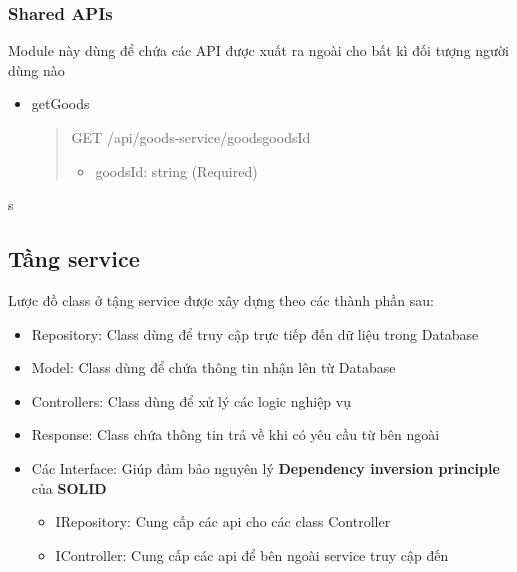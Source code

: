 \subsubsection{Shared APIs}
Module này dùng để chứa các API được xuất ra ngoài cho bất kì đối tượng người dùng nào

\begin{itemize}
	\item getGoods
	\begin{quote}
		GET /api/goods-service/goods{goodsId}
		\begin{itemize}
			\item goodsId: string (Required)
		\end{itemize}
	\end{quote}
\end{itemize}

s

\subsection{Tầng service}

Lược đồ class ở tậng service được xây dựng theo các thành phần sau:
\begin{itemize}
	\item Repository: Class dùng để truy cập trực tiếp đến dữ liệu trong Database
	\item Model: Class dùng để chứa thông tin nhận lên từ Database
	\item Controllers: Class dùng để xử lý các logic nghiệp vụ
	\item Response: Class chứa thông tin trả về khi có yêu cầu từ bên ngoài
	\item Các Interface: Giúp đảm bảo nguyên lý \textbf{Dependency inversion principle} của \textbf{SOLID}
	      \begin {itemize}
	\item IRepository: Cung cấp các api cho các class Controller
	\item IController: Cung cấp các api để bên ngoài service truy cập đến
\end{itemize}
\end{itemize}



